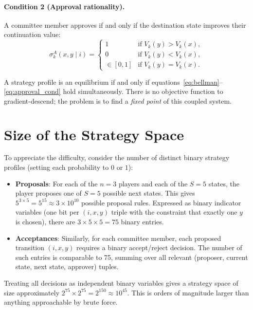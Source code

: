 \documentclass[11pt]{article}
\begin{document}
\paragraph{Condition 2 (Approval rationality).} A committee member approves if and only if the
destination state improves their continuation value:
\begin{equation}
  \sigma^A_k(x, y \mid i) =
  \begin{cases}
    1 & \text{if } V_k(y) > V_k(x), \\
    0 & \text{if } V_k(y) < V_k(x), \\
    \in [0,1] & \text{if } V_k(y) = V_k(x).
  \end{cases}
  \label{eq:approval_cond}
\end{equation}

A strategy profile is an equilibrium if and only if
equations~\eqref{eq:bellman}--\eqref{eq:approval_cond} hold simultaneously. There is no
objective function to gradient-descend; the problem is to find a \emph{fixed point} of this
coupled system.

\section{Size of the Strategy Space}

To appreciate the difficulty, consider the number of distinct binary strategy profiles (setting
each probability to $0$ or $1$):

\begin{itemize}
  \item \textbf{Proposals}: For each of the $n=3$ players and each of the $S=5$ states, the
    player proposes one of $S=5$ possible next states. This gives $5^{3 \times 5} = 5^{15} \approx
    3 \times 10^{10}$ possible proposal rules. Expressed as binary indicator variables (one bit per
    $(i, x, y)$ triple with the constraint that exactly one $y$ is chosen), there are $3 \times 5
    \times 5 = 75$ binary entries.
  \item \textbf{Acceptances}: Similarly, for each committee member, each proposed transition
    $(i, x, y)$ requires a binary accept/reject decision. The number of such entries is comparable
    to 75, summing over all relevant (proposer, current state, next state, approver) tuples.
\end{itemize}

Treating all decisions as independent binary variables gives a strategy space of size
approximately $2^{75} \times 2^{75} = 2^{150} \approx 10^{45}$. This is orders of magnitude
larger than anything approachable by brute force.
\end{document}
